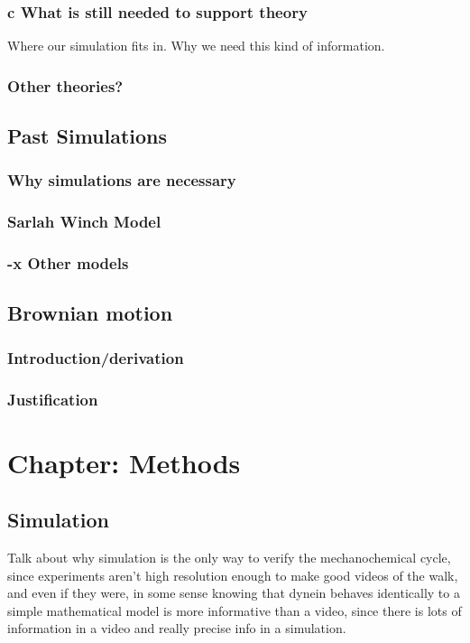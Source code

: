 \documentclass[10pt]{article} %
\begin{document}
\subsubsection{c What is still needed to support theory}
Where our simulation fits in. Why we need this kind of information.
\subsubsection{Other theories?}
	\subsection{Past Simulations}
		\subsubsection{Why simulations are necessary}
		\subsubsection{Sarlah Winch Model}
		\subsubsection{-x Other models}
	\subsection{Brownian motion}
                \subsubsection{Introduction/derivation}
                \subsubsection{Justification}
\section{Chapter: Methods}
\subsection{Simulation}
Talk about why simulation is the only way to verify the mechanochemical cycle, since experiments
aren't high resolution enough to make good videos of the walk, and even if they were, in some sense
knowing that dynein behaves identically to a simple mathematical model is more informative than
a video, since there is lots of information in a video and really precise info in a simulation.\\
\end{document}
